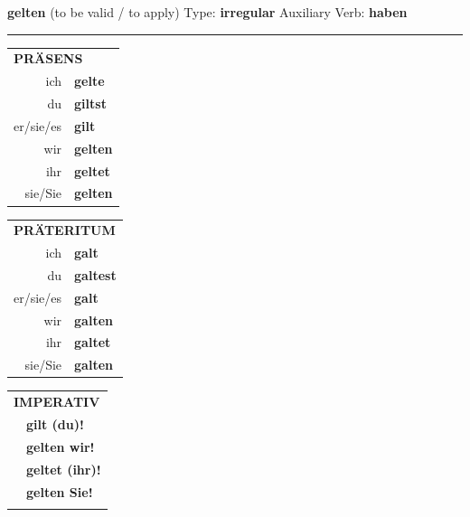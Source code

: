 \documentclass[10pt,a4paper]{revtex4-2}
\begin{document}
\begin{verbbox}
    {\Large \bf gelten} (to be valid / to apply) \hfill Type: \textbf{irregular} \hfill Auxiliary Verb: \textbf{haben} 
    
     \vspace{5pt}

    \hrule
    
    \vspace{5pt}

  \begin{tabular}{rl}
     \multicolumn{2}{l}{\textbf{PRÄSENS} }\\
    ich & \textbf{gelte}\\
    du & \textbf{giltst}\\
    er/sie/es & \textbf{gilt}\\
    wir & \textbf{gelten}\\
    ihr & \textbf{geltet}\\
    sie/Sie & \textbf{gelten}\\
  \end{tabular}
  \hfill
     \begin{tabular}{rl}
    \multicolumn{2}{l}{\textbf{PRÄTERITUM} }\\
    ich & \textbf{galt}\\
    du & \textbf{galtest}\\
    er/sie/es & \textbf{galt}\\
    wir & \textbf{galten}\\
    ihr & \textbf{galtet}\\
    sie/Sie & \textbf{galten}\\
  \end{tabular}
  \hfill
  \begin{tabular}{rl}
     \multicolumn{2}{l}{\textbf{IMPERATIV} }\\
   & \textbf{gilt (du)!}\\
   & \textbf{gelten wir!}\\
   & \textbf{geltet (ihr)!}\\
   & \textbf{gelten Sie!}\\
   & \vspace{10pt}
  \end{tabular}

    \vspace{10pt}


\end{verbbox}
\end{document}
